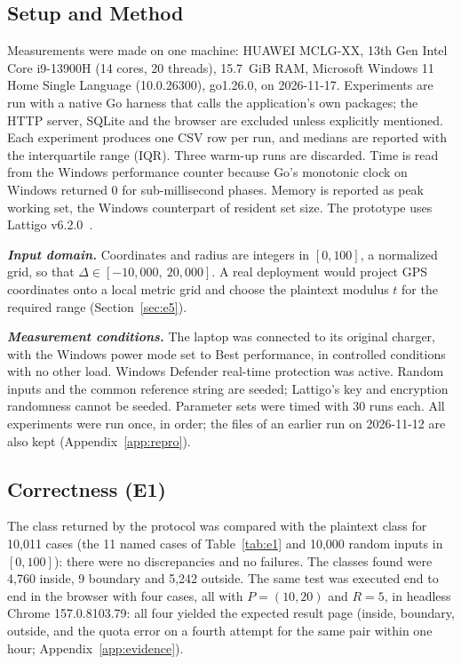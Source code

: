 \documentclass[conference,letterpaper]{IEEEtran}
\begin{document}
\subsection{Setup and Method}
Measurements were made on one machine: HUAWEI MCLG-XX, 13th Gen Intel Core i9-13900H (14 cores, 20 threads), 15.7~GiB RAM, Microsoft Windows 11 Home Single Language (10.0.26300), go1.26.0, on 2026-11-17. Experiments are run with a native Go harness that calls the application's own packages; the HTTP server, SQLite and the browser are excluded unless explicitly mentioned. Each experiment produces one CSV row per run, and medians are reported with the interquartile range (IQR). Three warm-up runs are discarded. Time is read from the Windows performance counter because Go's monotonic clock on Windows returned 0 for sub-millisecond phases. Memory is reported as peak working set, the Windows counterpart of resident set size. The prototype uses Lattigo v6.2.0~\cite{lattigo}.

\textbf{\textit{Input domain.}} Coordinates and radius are integers in $[0, 100]$, a normalized grid, so that $\Delta \in [-10{,}000,\ 20{,}000]$. A real deployment would project GPS coordinates onto a local metric grid and choose the plaintext modulus $t$ for the required range (Section~\ref{sec:e5}).

\textbf{\textit{Measurement conditions.}} The laptop was connected to its original charger, with the Windows power mode set to Best performance, in controlled conditions with no other load. Windows Defender real-time protection was active. Random inputs and the common reference string are seeded; Lattigo's key and encryption randomness cannot be seeded. Parameter sets were timed with 30 runs each. All experiments were run once, in order; the files of an earlier run on 2026-11-12 are also kept (Appendix~\ref{app:repro}).

\subsection{Correctness (E1)}
The class returned by the protocol was compared with the plaintext class for 10,011 cases (the 11 named cases of Table~\ref{tab:e1} and 10,000 random inputs in $[0, 100]$): there were no discrepancies and no failures. The classes found were 4,760 inside, 9 boundary and 5,242 outside. The same test was executed end to end in the browser with four cases, all with $P = (10, 20)$ and $R = 5$, in headless Chrome 157.0.8103.79: all four yielded the expected result page (inside, boundary, outside, and the quota error on a fourth attempt for the same pair within one hour; Appendix~\ref{app:evidence}).
\end{document}
